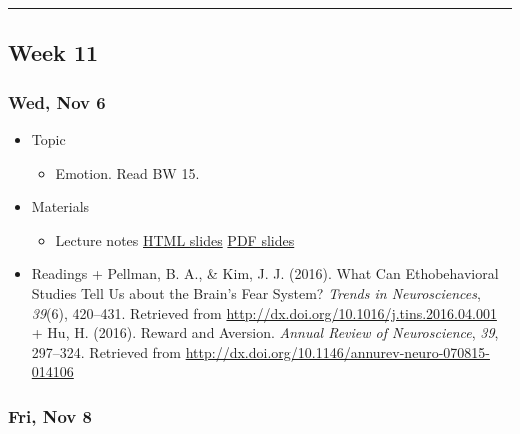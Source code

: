 \documentclass[]{article}
\providecommand{\tightlist}{%
  \setlength{\itemsep}{0pt}\setlength{\parskip}{0pt}}
\begin{document}
\begin{center}\rule{0.5\linewidth}{\linethickness}\end{center}

\hypertarget{week-11}{%
\subsection{Week 11}\label{week-11}}

\hypertarget{wed-nov-6}{%
\subsubsection{Wed, Nov 6}\label{wed-nov-6}}

\begin{itemize}
\tightlist
\item
  Topic

  \begin{itemize}
  \tightlist
  \item
    Emotion. Read BW 15.
  \end{itemize}
\item
  Materials

  \begin{itemize}
  \tightlist
  \item
    Lecture notes \textbar{} \href{}{HTML slides} \textbar{} \href{}{PDF
    slides}
  \end{itemize}
\item
  Readings + Pellman, B. A., \& Kim, J. J. (2016). What Can
  Ethobehavioral Studies Tell Us about the Brain's Fear System?
  \emph{Trends in Neurosciences}, \emph{39}(6), 420--431. Retrieved from
  \url{http://dx.doi.org/10.1016/j.tins.2016.04.001} + Hu, H. (2016).
  Reward and Aversion. \emph{Annual Review of Neuroscience}, \emph{39},
  297--324. Retrieved from
  \url{http://dx.doi.org/10.1146/annurev-neuro-070815-014106}
\end{itemize}

\hypertarget{fri-nov-8}{%
\subsubsection{Fri, Nov 8}\label{fri-nov-8}}
\end{document}
